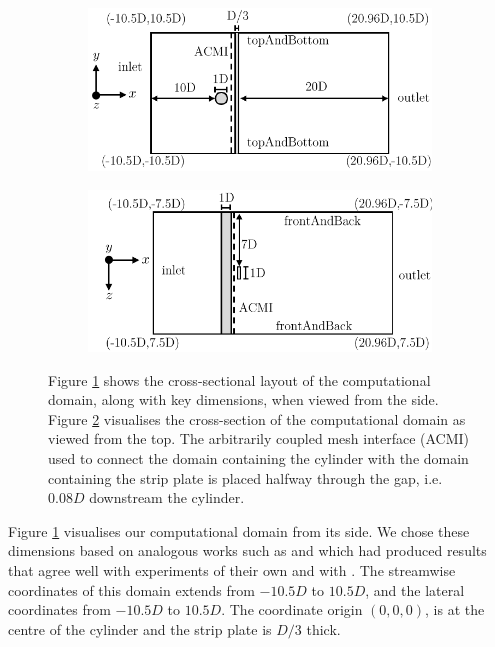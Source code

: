 \documentclass[a4paper,fleqn]{cas-sc}
\begin{document}
\begin{figure}
  \centering
  \begin{subfigure}[h]{0.5\textwidth}
    \includegraphics[width=\textwidth]{figs/problemGeometrySide}
    \caption{}
    \label{fig:probGeoSide}
  \end{subfigure}

  \begin{subfigure}[h]{0.5\textwidth}
    \includegraphics[width=\textwidth]{figs/problemGeometryTop}
    \caption{}
    \label{fig:probGeoTop}
  \end{subfigure}

  \caption{Figure \ref{fig:probGeoSide} shows the cross-sectional layout of the computational domain, along with key dimensions, when viewed from the side. Figure \ref{fig:probGeoTop} visualises the cross-section of the computational domain as viewed from the top. The arbitrarily coupled mesh interface (ACMI) used to connect the domain containing the cylinder with the domain containing the strip plate is placed halfway through the gap, i.e. $0.08D$ downstream the cylinder.} \label{fig:problemGeometry}
\end{figure}

Figure \ref{fig:probGeoSide} visualises our computational domain from its side. We chose these dimensions based on analogous works such as \cite{Maruai2017} and \cite{Maruai2018} which had produced results that agree well with experiments of their own and with \citet{Kawabata2013}. The streamwise coordinates of this domain extends from $-10.5D$ to $10.5D$, and the lateral coordinates from $-10.5D$ to $10.5D$. The coordinate origin $(0,0,0)$, is at the centre of the cylinder and the strip plate is $D/3$ thick.
\end{document}
